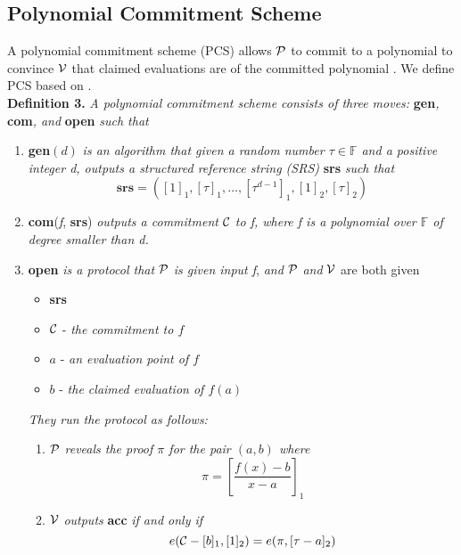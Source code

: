 \subsection{Polynomial Commitment Scheme}
A polynomial commitment scheme (PCS) allows $\mathcal{P}$ to commit to a polynomial to convince $\mathcal{V}$ that claimed evaluations are of the committed polynomial \cite{kzg}. We define PCS based on \cite{kzg,plonk,bdfg}. \\
\textbf{Definition 3.} \textit{A polynomial commitment scheme consists of three moves:} \textbf{gen}\textit{,} \textbf{com}\textit{, and} \textbf{open} \textit{such that}
\begin{enumerate}
    \item \textbf{gen}$(d)$ \textit{is an algorithm that given a random number $\tau\in\mathbb{F}$ and a positive integer d, outputs a structured reference string (SRS)} \textbf{srs} \textit{such that} 
    \[ \textbf{srs}=([1]_1,[\tau]_1,\dots,[\tau^{d-1}]_1,[1]_2,[\tau]_2) \]
    \item \textbf{com}(\textit{f}, \textbf{srs}) \textit{outputs a commitment} $\mathcal{C}$ \textit{to f, where f is a polynomial over $\mathbb{F}$ of degree smaller than d.}
    \item \textbf{open} \textit{is a protocol that} $\mathcal{P}$ \textit{is given input f}, \textit{and} $\mathcal{P}$ \textit{and} $\mathcal{V}$ are both given
    \begin{itemize}
        \item \textbf{srs}
        \item $\mathcal{C}$ - \textit{the commitment to $f$}
        \item $a$ - \textit{an evaluation point of $f$}
        \item $b$ - \textit{the claimed evaluation of $f(a)$}
    \end{itemize}
    \textit{They run the protocol as follows:}
    \begin{enumerate}
        \item $\mathcal{P}$ \textit{reveals the proof $\pi$ for the pair $(a,b)$ where}
        \[ \pi=[\frac{f(x)-b}{x-a}]_1 \]
        \item $\mathcal{V}$ \textit{outputs} \textbf{acc} \textit{if and only if}
        \[ e(\mathcal{C}-[b]_1,[1]_2)=e(\pi,[\tau-a]_2) \]
    \end{enumerate}
\end{enumerate}
